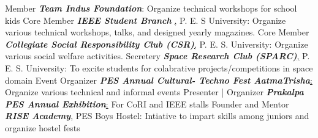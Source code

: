 	\begin{cvskills}
	\cvskill
		{Member}
		{\textit{\textbf{Team Indus Foundation}}: Organize technical workshops for school kids}
	\cvskill
		{Core Member}
		{\textit{\textbf{IEEE Student Branch }}\href{http://ieee.pes.edu/}, P. E. S University: Organize various technical workshops, talks, and designed yearly magazines.}
	\cvskill
		{Core Member}
		{\textit{\textbf{Collegiate Social Responsibility Club (CSR)}}\href{http://pes.edu/clubs/pes-csr-club/}, P. E. S. University: Organize various social welfare activities.}
	\cvskill
		{Secretery}
		{\textit{\textbf{Space Research Club (SPARC)}}\href{https://www.facebook.com/Space-Research-Club-Of-PES-University-487153011445398/?tn-str=k*F}, P. E. S. University: To excite students for colabrative projects/competitions in space domain}
	\cvskill
		{Event Organizer}
		{\textit{\textbf{PES Annual Cultural- Techno Fest AatmaTrisha}}\href{http://pes.edu/clubs/atmatrisha/}: Organize various technical and informal events}
	\cvskill
		{Presenter | Organizer}
		{\textit{\textbf{Prakalpa PES Annual Exhibition}}\href{http://pes.edu/clubs/prakalpa/}: For CoRI and IEEE stalls}
	\cvskill
		{Founder and Mentor}
		{\textit{\textbf{RISE Academy}}, PES Boys Hostel: Intiative to impart skills among juniors and organize hostel fests}
\end{cvskills}
